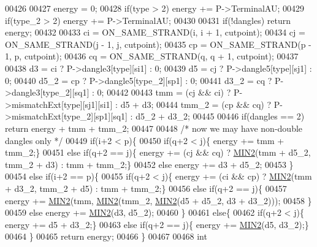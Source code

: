 \begin{DoxyCode}
00426 
00427   energy = 0;
00428   \textcolor{keywordflow}{if}(type > 2)   energy += P->TerminalAU;
00429   \textcolor{keywordflow}{if}(type\_2 > 2) energy += P->TerminalAU;
00430 
00431   \textcolor{keywordflow}{if}(!dangles) \textcolor{keywordflow}{return} energy;
00432 
00433   ci = ON\_SAME\_STRAND(i, i + 1, cutpoint);
00434   cj = ON\_SAME\_STRAND(j - 1, j, cutpoint);
00435   cp = ON\_SAME\_STRAND(p - 1, p, cutpoint);
00436   cq = ON\_SAME\_STRAND(q, q + 1, cutpoint);
00437 
00438   d3    = ci  ? P->dangle3[type][si1]   : 0;
00439   d5    = cj  ? P->dangle5[type][sj1]   : 0;
00440   d5\_2  = cp  ? P->dangle5[type\_2][sp1] : 0;
00441   d3\_2  = cq  ? P->dangle3[type\_2][sq1] : 0;
00442 
00443   tmm   = (cj && ci) ? P->mismatchExt[type][sj1][si1]   : d5 + d3;
00444   tmm\_2 = (cp && cq) ? P->mismatchExt[type\_2][sp1][sq1] : d5\_2 + d3\_2;
00445 
00446   \textcolor{keywordflow}{if}(dangles == 2) \textcolor{keywordflow}{return} energy + tmm + tmm\_2;
00447 
00448   \textcolor{comment}{/* now we may have non-double dangles only */}
00449   \textcolor{keywordflow}{if}(i+2 < p)\{
00450     \textcolor{keywordflow}{if}(q+2 < j)\{ energy += tmm + tmm\_2;\}
00451     \textcolor{keywordflow}{else} \textcolor{keywordflow}{if}(q+2 == j)\{ energy += (cj && cq) ? \hyperlink{group__utils_ga2dd4a927a7f937f43a90c144d79107d8}{MIN2}(tmm + d5\_2, tmm\_2 + d3) : tmm + tmm\_2;\}
00452     \textcolor{keywordflow}{else} energy += d3 + d5\_2;
00453   \}
00454   \textcolor{keywordflow}{else} \textcolor{keywordflow}{if}(i+2 == p)\{
00455     \textcolor{keywordflow}{if}(q+2 < j)\{ energy += (ci && cp) ? \hyperlink{group__utils_ga2dd4a927a7f937f43a90c144d79107d8}{MIN2}(tmm + d3\_2, tmm\_2 + d5) : tmm + tmm\_2;\}
00456     \textcolor{keywordflow}{else} \textcolor{keywordflow}{if}(q+2 == j)\{
00457       energy += \hyperlink{group__utils_ga2dd4a927a7f937f43a90c144d79107d8}{MIN2}(tmm, \hyperlink{group__utils_ga2dd4a927a7f937f43a90c144d79107d8}{MIN2}(tmm\_2, \hyperlink{group__utils_ga2dd4a927a7f937f43a90c144d79107d8}{MIN2}(d5 + d5\_2, d3 + d3\_2)));
00458     \}
00459     \textcolor{keywordflow}{else} energy += \hyperlink{group__utils_ga2dd4a927a7f937f43a90c144d79107d8}{MIN2}(d3, d5\_2);
00460   \}
00461   \textcolor{keywordflow}{else}\{
00462     \textcolor{keywordflow}{if}(q+2 < j)\{ energy += d5 + d3\_2;\}
00463     \textcolor{keywordflow}{else} \textcolor{keywordflow}{if}(q+2 == j)\{ energy += \hyperlink{group__utils_ga2dd4a927a7f937f43a90c144d79107d8}{MIN2}(d5, d3\_2);\}
00464   \}
00465   \textcolor{keywordflow}{return} energy;
00466 \}
00467 
00468 \textcolor{keywordtype}{int}

\end{DoxyCode}
